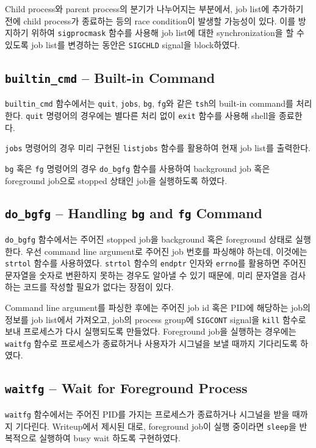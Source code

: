 \documentclass{scrartcl}
\begin{document}
Child process와 parent process의 분기가 나누어지는 부분에서, job list에
추가하기 전에 child process가 종료하는 등의 race condition이 발생할 가능성이
있다. 이를 방지하기 위하여 \texttt{sigprocmask} 함수를 사용해 job list에 대한
synchronization을 할 수 있도록 job list를 변경하는 동안은 \texttt{SIGCHLD}
signal을 block하였다.

\subsection{\texttt{builtin\_cmd} -- Built-in Command}
\texttt{builtin\_cmd} 함수에서는 \texttt{quit}, \texttt{jobs}, \texttt{bg},
\texttt{fg}와 같은 \texttt{tsh}의 built-in command를 처리한다. \texttt{quit}
명령어의 경우에는 별다른 처리 없이 \texttt{exit} 함수를 사용해 shell을
종료한다.

\texttt{jobs} 명령어의 경우 미리 구현된 \texttt{listjobs} 함수를 활용하여 현재
job list를 출력한다.

\texttt{bg} 혹은 \texttt{fg} 명령어의 경우 \texttt{do\_bgfg} 함수를 사용하여
background job 혹은 foreground job으로 stopped 상태인 job을 실행하도록 하였다.

\subsection{\texttt{do\_bgfg} -- Handling \texttt{bg} and \texttt{fg} Command}
\texttt{do\_bgfg} 함수에서는 주어진 stopped job을 background 혹은 foreground
상태로 실행한다. 우선 command line argument로 주어진 job 번호를 파싱해야
하는데, 이것에는 \texttt{strtol} 함수를 사용하였다. \texttt{strtol} 함수의
\texttt{endptr} 인자와 \texttt{errno}를 활용하면 주어진 문자열을 숫자로
변환하지 못하는 경우도 알아낼 수 있기 때문에, 미리 문자열을 검사하는 코드를
작성할 필요가 없다는 장점이 있다.

Command line argument를 파싱한 후에는 주어진 job id 혹은 PID에 해당하는 job의
정보를 job list에서 가져오고, job의 process group에 \texttt{SIGCONT} signal을
\texttt{kill} 함수로 보내 프로세스가 다시 실행되도록 만들었다. Foreground job을
실행하는 경우에는 \texttt{waitfg} 함수로 프로세스가 종료하거나 사용자가
시그널을 보낼 때까지 기다리도록 하였다.

\subsection{\texttt{waitfg} -- Wait for Foreground Process}
\texttt{waitfg} 함수에서는 주어진 PID를 가지는 프로세스가 종료하거나 시그널을
받을 때까지 기다린다. Writeup에서 제시된 대로, foreground job이 실행 중이라면
\texttt{sleep}을 반복적으로 실행하여 busy wait 하도록 구현하였다.
\end{document}
